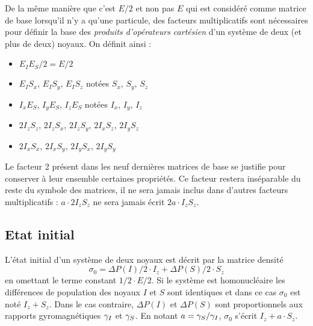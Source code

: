 De la même manière que c'est $E/2$ et non pas $E$ qui est considéré comme matrice de
base lorsqu'il n'y a qu'une particule, des facteurs multiplicatifs
sont nécessaires pour définir la base des \emph{produits d'opérateurs cartésien}
d'un système de deux (et plus de deux) noyaux.
On définit ainsi :
\begin{itemize}
\item $E_IE_S/2 =  E/2$
\item $E_IS_x$, $E_IS_y$, $E_IS_z$ notées $S_x$, $S_y$, $S_z$
\item $I_xE_S$, $I_yE_S$, $I_zE_S$ notées $I_x$, $I_y$, $I_z$
\item $2I_zS_z$, $2I_zS_x$, $2I_zS_y$, $2I_xS_z$, $2I_yS_z$
\item $2I_xS_x$, $2I_xS_y$, $2I_yS_x$, $2I_yS_y$
\end{itemize}

Le facteur 2 présent dans les neuf dernières matrices de base se justifie pour conserver à 
leur ensemble certaines propriétés. 
Ce facteur restera inséparable du reste du symbole des matrices, 
il ne sera jamais inclus dans d'autres facteurs multiplicatifs : $a \cdot 2I_zS_z$
ne sera jamais écrit $2a \cdot I_zS_z$.

\subsection{Etat initial}
L'état initial d'un système de deux noyaux est décrit par la matrice densité
\begin{equation}
\sigma_0 = \Delta P(I)/2 \cdot I_z + \Delta P(S)/2 \cdot S_z
\end{equation}
en omettant le terme constant $1/2 \cdot E/2$. 
Si le système est homonucléaire les différences de population des noyaux $I$ et $S$
sont identiques et dans ce cas $\sigma_0$ est noté $I_z + S_z$. 
Dans le cas contraire, $\Delta P(I)$ et $\Delta P(S)$ sont proportionnels aux rapports 
gyromagnétiques $\gamma_I$ et $\gamma_S$. 
En notant $a = \gamma_S/\gamma_I$, $\sigma_0$ s'écrit $I_z + a \cdot S_z$.

